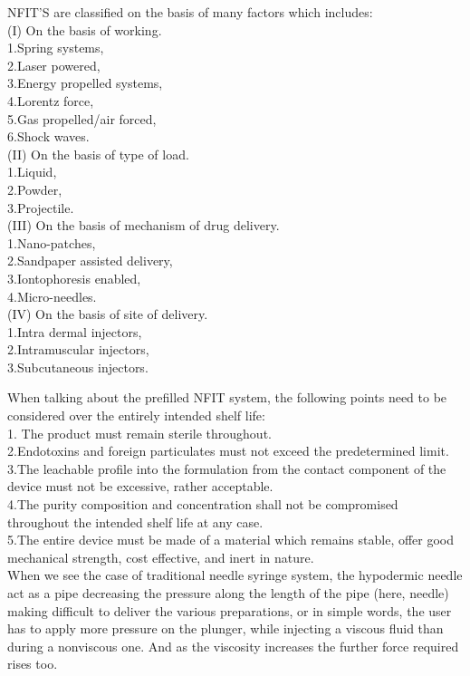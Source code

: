 \documentclass[12pt]{article}
\begin{document}
NFIT'S are classified on the basis of many factors which includes:
\\
(I)	On the basis of working.
\\
 1.Spring systems,
 \\
 2.Laser powered, 
 \\
 3.Energy propelled systems,
 \\
 4.Lorentz force, 
 \\
 5.Gas propelled/air forced, 
 \\
 6.Shock waves.
\\
(II)	On the basis of type of load.
\\
1.Liquid, 
\\
2.Powder,
\\
3.Projectile.
\\
(III)	On the basis of mechanism of drug delivery.
\\
1.Nano-patches,
\\
2.Sandpaper assisted delivery,
\\
3.Iontophoresis enabled,
\\
4.Micro-needles.
\\
(IV)	On the basis of site of delivery.
\\
1.Intra dermal injectors,
\\
2.Intramuscular injectors,
\\
3.Subcutaneous injectors.

\indent

When talking about the prefilled NFIT system, the following points need to be considered over the entirely intended shelf life:
\\
1. The product must remain sterile throughout.
\\
2.Endotoxins and foreign particulates must not exceed the predetermined limit.
\\
3.The leachable profile into the formulation from the contact component of the device must not be excessive, rather acceptable.
\\
4.The purity composition and concentration shall not be compromised throughout the intended shelf life at any case.
\\
5.The entire device must be made of a material which remains stable, offer good mechanical strength, cost effective, and inert in nature.
\\

When we see the case of traditional needle syringe system, the hypodermic needle act as a pipe decreasing the pressure along the length of the pipe (here, needle) making difficult to deliver the various preparations, or in simple words, the user has to apply more pressure on the plunger, while injecting a viscous fluid than during a nonviscous one. And as the viscosity increases the further force required rises too.
\end{document}
